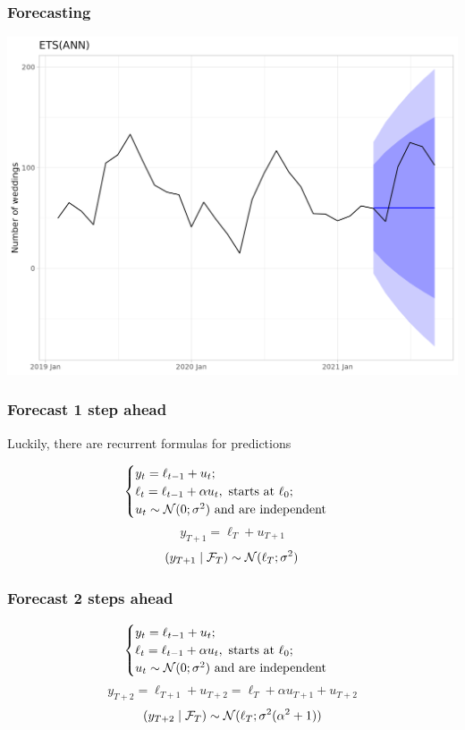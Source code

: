 \begin{frame}
	\frametitle{Forecasting}
	
	\includegraphics[width=\textwidth]{pictures/om_ts_02-025.png}
	
	
\end{frame}


\begin{frame}
	\frametitle{Forecast 1 step ahead}
	
	Luckily, there are \alert{recurrent formulas} for predictions
	\pause
	
	\[
	\begin{cases}
		y_t = \ell_{t-1} + u_t; \\
		\ell_t = \ell_{t-1} + \alpha u_t, \text{ starts at } \ell_0; \\
		u_t \sim \mathcal{N}(0;\sigma^2) \text{ and are independent}\\
	\end{cases}
	\]
	\pause
	\[
	y_{T+1} = \ell_T + u_{T+1}
	\]
	\pause
	\[
	(y_{T+1} \mid \mathcal F_T) \sim \mathcal{N}(\ell_T; \sigma^2)
	\]
	
\end{frame}


\begin{frame}
	\frametitle{Forecast 2 steps ahead}
	
	\[
	\begin{cases}
		y_t = \ell_{t-1} + u_t;\\
		\ell_t = \ell_{t-1} + \alpha u_t, \text{ starts at } \ell_0; \\
		u_t \sim \mathcal{N}(0;\sigma^2) \text{ and are independent}\\
	\end{cases}
	\]
	\pause
	\[
	y_{T+2} = \ell_{T+1} + u_{T+2} = \ell_T + \alpha u_{T+1} + u_{T+2}
	\]
	\pause
	\[
	(y_{T+2} \mid \mathcal F_T) \sim \mathcal{N}(\ell_T; \sigma^2(\alpha^2 + 1))
	\]
	
\end{frame}

